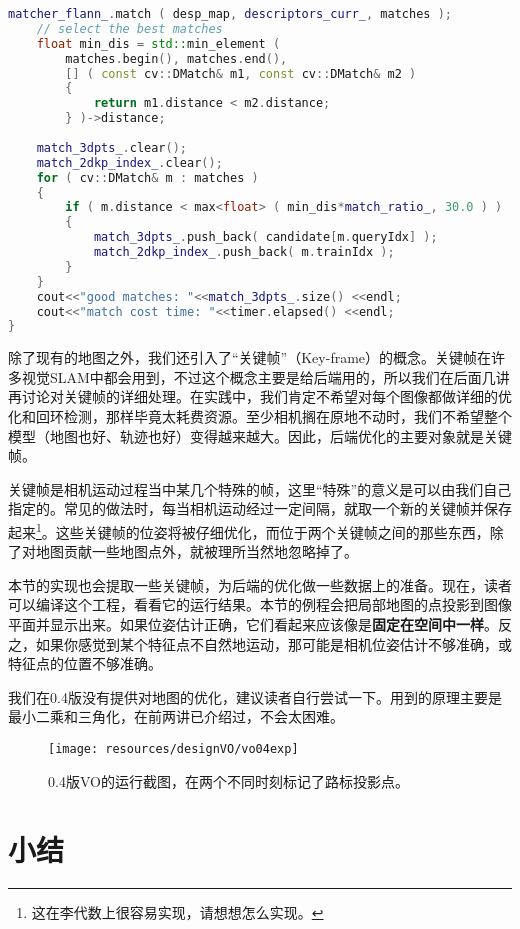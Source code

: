 \begin{enumerate}
\begin{lstlisting}[language=c++]
	matcher_flann_.match ( desp_map, descriptors_curr_, matches );
	// select the best matches
	float min_dis = std::min_element (
		matches.begin(), matches.end(),
		[] ( const cv::DMatch& m1, const cv::DMatch& m2 )
		{
			return m1.distance < m2.distance;
		} )->distance;
	
	match_3dpts_.clear();
	match_2dkp_index_.clear();
	for ( cv::DMatch& m : matches )
	{
		if ( m.distance < max<float> ( min_dis*match_ratio_, 30.0 ) )
		{
			match_3dpts_.push_back( candidate[m.queryIdx] );
			match_2dkp_index_.push_back( m.trainIdx );
		}
	}
	cout<<"good matches: "<<match_3dpts_.size() <<endl;
	cout<<"match cost time: "<<timer.elapsed() <<endl;
}
\end{lstlisting}

\end{enumerate}

除了现有的地图之外，我们还引入了“关键帧”（Key-frame）的概念。关键帧在许多视觉SLAM中都会用到，不过这个概念主要是给后端用的，所以我们在后面几讲再讨论对关键帧的详细处理。在实践中，我们肯定不希望对每个图像都做详细的优化和回环检测，那样毕竟太耗费资源。至少相机搁在原地不动时，我们不希望整个模型（地图也好、轨迹也好）变得越来越大。因此，后端优化的主要对象就是关键帧。

\clearpage
关键帧是相机运动过程当中某几个特殊的帧，这里“特殊”的意义是可以由我们自己指定的。常见的做法时，每当相机运动经过一定间隔，就取一个新的关键帧并保存起来\footnote{这在李代数上很容易实现，请想想怎么实现。}。这些关键帧的位姿将被仔细优化，而位于两个关键帧之间的那些东西，除了对地图贡献一些地图点外，就被理所当然地忽略掉了。

本节的实现也会提取一些关键帧，为后端的优化做一些数据上的准备。现在，读者可以编译这个工程，看看它的运行结果。本节的例程会把局部地图的点投影到图像平面并显示出来。如果位姿估计正确，它们看起来应该像是\textbf{固定在空间中一样}。反之，如果你感觉到某个特征点不自然地运动，那可能是相机位姿估计不够准确，或特征点的位置不够准确。

我们在0.4版没有提供对地图的优化，建议读者自行尝试一下。用到的原理主要是最小二乘和三角化，在前两讲已介绍过，不会太困难。

\begin{figure}[!htp]
\centering
\texttt{[image: resources/designVO/vo04exp]}
\caption{0.4版VO的运行截图，在两个不同时刻标记了路标投影点。}
\label{fig:vo04exp}
\end{figure}

\section{小结}

